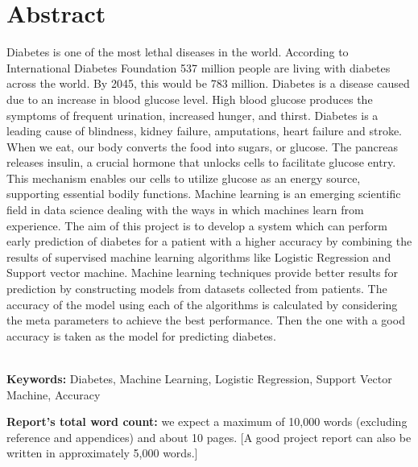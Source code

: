 \chapter*{\center \Large  Abstract}

Diabetes is one of the most lethal diseases in the world. According to International Diabetes Foundation 537 million people are living with diabetes across the world. By 2045, this would be 783 million. Diabetes is a disease caused due to an increase in blood glucose level. High blood glucose produces the symptoms of frequent urination, increased hunger, and thirst. Diabetes is a leading cause of blindness, kidney failure, amputations, heart failure and stroke. When we eat, our body converts the food into sugars, or glucose. The pancreas releases insulin, a crucial hormone that unlocks cells to facilitate glucose entry. This mechanism enables our cells to utilize glucose as an energy source, supporting essential bodily functions. Machine learning is an emerging scientific field in data science dealing with the ways in which machines learn from experience. The aim of this project is to develop a system which can perform early prediction of diabetes for a patient with a higher accuracy by combining the results of supervised machine learning algorithms like Logistic Regression and Support vector machine. Machine learning techniques provide better results for prediction by constructing models from datasets collected from patients. The accuracy of the model using each of the algorithms is calculated by considering the meta parameters to achieve the best performance. Then the one with a good accuracy is taken as the model for predicting diabetes.



~\\[1cm]
\noindent %
\textbf{Keywords:} Diabetes, Machine Learning, Logistic Regression, Support Vector Machine, Accuracy

\vfill
\noindent
\textbf{Report's total word count:} we expect a maximum of 10,000 words (excluding reference and appendices) and about 10 pages. [A good project report can also be written in approximately 5,000 words.]

